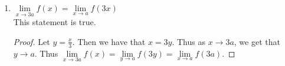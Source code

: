 \documentclass[12pt,letterpaper]{article}
\theoremstyle{case}
\theoremstyle{definition}
\begin{document}
\begin{enumerate}
\begin{enumerate}
			\item $\lim\limits_{x \to 3a} f(x) = \lim\limits_{x \to a} f(3x)$\\
			
			This statement is true.
			\begin{proof}
				Let $y=\frac{x}{3}$. Then we have that $x = 3y$. Thus as $x \to 3a$, we get that $y \to a$. Thus $\lim\limits_{x \to 3a} f(x)=\lim\limits_{y \to a} f(3y) = \lim\limits_{x \to a} f(3a)$.
			\end{proof}
		\end{enumerate}
	\end{enumerate}
\end{document}
